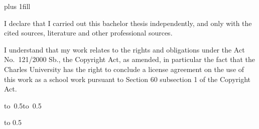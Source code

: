 


\openright
\hypersetup{pageanchor=true}
\pagestyle{plain}
\vglue 0pt plus 1fill

\noindent
I declare that I carried out this bachelor thesis independently, and only with the cited
sources, literature and other professional sources.

\medskip\noindent
I understand that my work relates to the rights and obligations under the Act No.~121/2000 Sb.,
the Copyright Act, as amended, in particular the fact that the Charles
University has the right to conclude a license agreement on the use of this
work as a school work pursuant to Section 60 subsection 1 of the Copyright Act.

\vspace{10mm}

\hbox{\hbox to 0.5\hbox to 0.5}

\vspace{20mm}
\newpage

\openright

\noindent
\Dedication

\newpage


\openright

\vbox to 0.5

\newpage

\openright
\pagestyle{plain}
\setcounter{page}{1}
